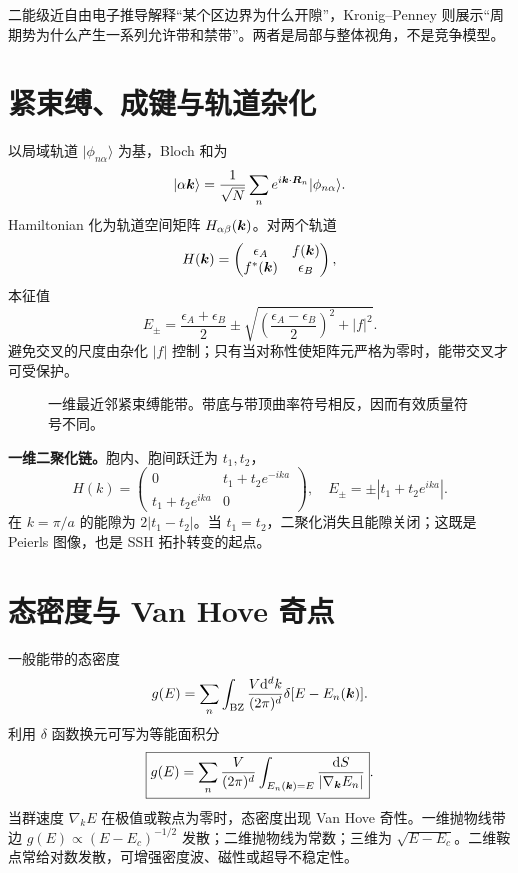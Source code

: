 \begin{whybox}
二能级近自由电子推导解释“某个区边界为什么开隙”，Kronig--Penney 则展示“周期势为什么产生一系列允许带和禁带”。两者是局部与整体视角，不是竞争模型。
\end{whybox}

\section{紧束缚、成键与轨道杂化}
以局域轨道 $|\phi_{n\alpha}\rangle$ 为基，Bloch 和为
\[
|\alpha\bm{k}\rangle=\frac1{\sqrt N}\sum_n
e^{i\bm{k}\cdot\bm{R}_n}|\phi_{n\alpha}\rangle.
\]
Hamiltonian 化为轨道空间矩阵 $H_{\alpha\beta}(\bm{k})$。对两个轨道
\[
H(\bm{k})=\begin{pmatrix}\epsilon_A&f(\bm{k})\\
f^*(\bm{k})&\epsilon_B\end{pmatrix},
\]
本征值
\[
E_\pm=\frac{\epsilon_A+\epsilon_B}{2}\pm
\sqrt{\left(\frac{\epsilon_A-\epsilon_B}{2}\right)^2+|f|^2}.
\]
避免交叉的尺度由杂化 $|f|$ 控制；只有当对称性使矩阵元严格为零时，能带交叉才可受保护。

\begin{figure}[htbp]
\centering
{}
\caption{一维最近邻紧束缚能带。带底与带顶曲率符号相反，因而有效质量符号不同。}
\end{figure}

\begin{examplebox}
\textbf{一维二聚化链。}胞内、胞间跃迁为 $t_1,t_2$，
\[
H(k)=\begin{pmatrix}0&t_1+t_2e^{-ika}\\
t_1+t_2e^{ika}&0\end{pmatrix},
\quad E_\pm=\pm|t_1+t_2e^{ika}|.
\]
在 $k=\pi/a$ 的能隙为 $2|t_1-t_2|$。当 $t_1=t_2$，二聚化消失且能隙关闭；这既是 Peierls 图像，也是 SSH 拓扑转变的起点。
\end{examplebox}

\section{态密度与 Van Hove 奇点}
一般能带的态密度
\[
g(E)=\sum_n\int_{\rm BZ}\frac{V\mathrm d^dk}{(2\pi)^d}
\delta[E-E_n(\bm{k})].
\]
利用 $\delta$ 函数换元可写为等能面积分
\[
\boxed{g(E)=\sum_n\frac{V}{(2\pi)^d}
\int_{E_n(\bm{k})=E}\frac{\mathrm d S}{|\nabla_{\bm{k}}E_n|}}.
\]
当群速度 $\nabla_kE$ 在极值或鞍点为零时，态密度出现 Van Hove 奇性。一维抛物线带边
$g(E)\propto(E-E_c)^{-1/2}$ 发散；二维抛物线为常数；三维为
$\sqrt{E-E_c}$。二维鞍点常给对数发散，可增强密度波、磁性或超导不稳定性。

